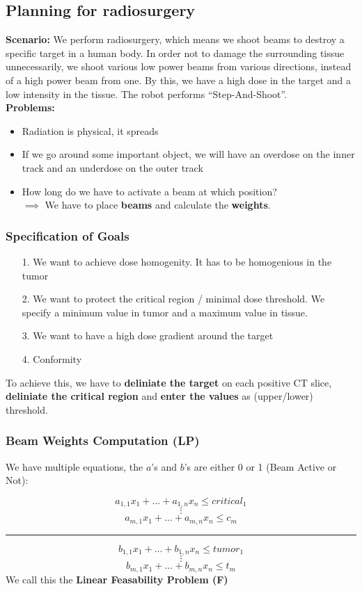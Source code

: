 \documentclass{exerciseBlue}
\begin{document}
\subsection{Planning for radiosurgery}
\textbf{Scenario:} We perform radiosurgery, which means we shoot beams to destroy a specific target in a human body. In order not to damage the surrounding tissue unnecessarily, we shoot various low power beams from various directions, instead of a high power beam from one. By this, we have a high dose in the target and a low intensity in the tissue. The robot performs ``Step-And-Shoot''.\\
\textbf{Problems:}
\begin{itemize}
	\item Radiation is physical, it spreads
	\item If we go around some important object, we will have an overdose on the inner track and an underdose on the outer track
	\item How long do we have to activate a beam at which position?\\
	$\implies$ We have to place \textbf{beams} and calculate the \textbf{weights}.
\end{itemize}
\subsubsection{Specification of Goals}
\begin{itemize}
	\item[1.] We want to achieve dose homogenity. It has to be homogenious in the tumor
	\item[2.] We want to protect the critical region / minimal dose threshold. We specify a minimum value in tumor and a maximum value in tissue.
	\item[3.] We want to have a high dose gradient around the target
	\item[4.] Conformity
\end{itemize}
To achieve this, we have to \textbf{deliniate the target} on each positive CT slice, \textbf{deliniate the critical region} and \textbf{enter the values} as (upper/lower) threshold.
\subsubsection{Beam Weights Computation (LP)}
We have multiple equations, the $a$'s and $b$'s are either 0 or 1 (Beam Active or Not):

$$a_{1,1}x_1 + \dots + a_{1,n}x_n \leq critical_1$$
$$\vdots$$
$$a_{m,1}x_1 + \dots + a_{m,n}x_n \leq c_m$$
\noindent\rule{\textwidth}{0.3pt}
$$b_{1,1}x_1 + \dots + b_{1,n}x_n \leq tumor_1$$
$$\vdots$$
$$b_{m,1}x_1 + \dots + b_{m,n}x_n \leq t_m$$
We call this the \textbf{Linear Feasability Problem (F)}
\end{document}
